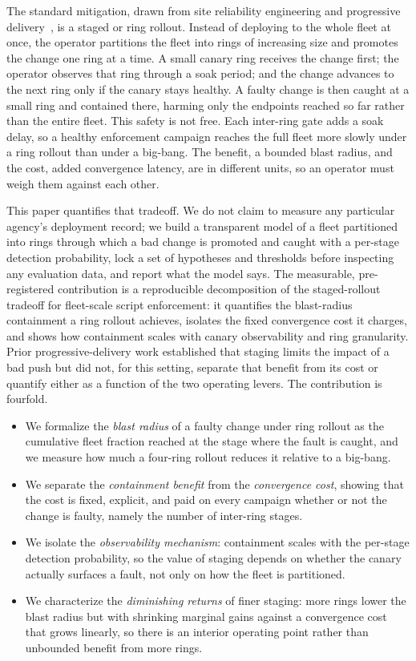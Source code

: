 \documentclass[journal]{IEEEtran}
\begin{document}
The standard mitigation, drawn from site reliability engineering and progressive
delivery~\cite{beyer2016sre,schermann2018live}, is a staged or ring rollout. Instead of deploying to
the whole fleet at once, the operator partitions the fleet into rings of increasing size and
promotes the change one ring at a time. A small canary ring receives the change first; the operator
observes that ring through a soak period; and the change advances to the next ring only if the
canary stays healthy. A faulty change is then caught at a small ring and contained there, harming
only the endpoints reached so far rather than the entire fleet. This safety is not free. Each
inter-ring gate adds a soak delay, so a healthy enforcement campaign reaches the full fleet more
slowly under a ring rollout than under a big-bang. The benefit, a bounded blast radius, and the
cost, added convergence latency, are in different units, so an operator must weigh them against each
other.

This paper quantifies that tradeoff. We do not claim to measure any particular agency's deployment
record; we build a transparent model of a fleet partitioned into rings through which a bad change is
promoted and caught with a per-stage detection probability, lock a set of hypotheses and thresholds
before inspecting any evaluation data, and report what the model says. The measurable, pre-registered
contribution is a reproducible decomposition of the staged-rollout tradeoff for fleet-scale script
enforcement: it quantifies the blast-radius containment a ring rollout achieves, isolates the fixed
convergence cost it charges, and shows how containment scales with canary observability and ring
granularity. Prior progressive-delivery work established that staging limits the impact of a bad push
but did not, for this setting, separate that benefit from its cost or quantify either as a function of
the two operating levers. The contribution is fourfold.

\begin{itemize}
\item We formalize the \emph{blast radius} of a faulty change under ring rollout as the cumulative
fleet fraction reached at the stage where the fault is caught, and we measure how much a four-ring
rollout reduces it relative to a big-bang.
\item We separate the \emph{containment benefit} from the \emph{convergence cost}, showing that the
cost is fixed, explicit, and paid on every campaign whether or not the change is faulty, namely the
number of inter-ring stages.
\item We isolate the \emph{observability mechanism}: containment scales with the per-stage detection
probability, so the value of staging depends on whether the canary actually surfaces a fault, not
only on how the fleet is partitioned.
\item We characterize the \emph{diminishing returns} of finer staging: more rings lower the blast
radius but with shrinking marginal gains against a convergence cost that grows linearly, so there is
an interior operating point rather than unbounded benefit from more rings.
\end{itemize}
\end{document}
